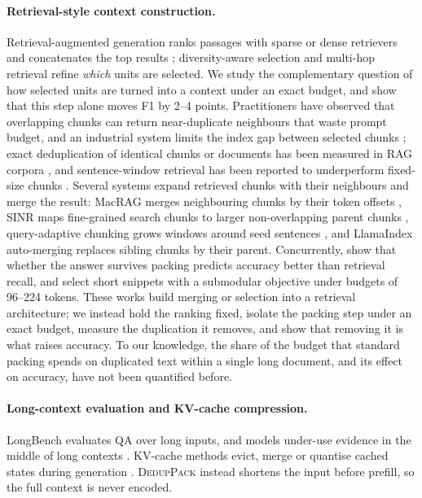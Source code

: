 \documentclass[11pt]{article}
\newcommand{\spk}{\textsc{DedupPack}}
\begin{document}
\paragraph{Retrieval-style context construction.}
Retrieval-augmented generation ranks passages with sparse \citep{robertson2009probabilistic} or dense \citep{karpukhin2020dense,xiao2023cpack} retrievers and concatenates the top results \citep{lewis2020retrieval,izacard2021leveraging}; diversity-aware selection \citep{carbonell1998mmr} and multi-hop retrieval \citep{xiong2021answering,trivedi2023interleaving} refine \emph{which} units are selected. We study the complementary question of how selected units are turned into a context under an exact budget, and show that this step alone moves F1 by 2--4 points. Practitioners have observed that overlapping chunks can return near-duplicate neighbours that waste prompt budget, and an industrial system limits the index gap between selected chunks \citep{sundar2026overlap}; exact deduplication of identical chunks or documents has been measured in RAG corpora \citep{bytedup2026}, and sentence-window retrieval has been reported to underperform fixed-size chunks \citep{eibich2024aragog}. Several systems expand retrieved chunks with their neighbours and merge the result: MacRAG merges neighbouring chunks by their token offsets \citep{lim2025macrag}, SINR maps fine-grained search chunks to larger non-overlapping parent chunks \citep{nainwani2025search}, query-adaptive chunking grows windows around seed sentences \citep{rastogi2026qasc}, and LlamaIndex auto-merging replaces sibling chunks by their parent. Concurrently, \citet{bala2026recall} show that whether the answer survives packing predicts accuracy better than retrieval recall, and select short snippets with a submodular objective under budgets of 96--224 tokens. These works build merging or selection into a retrieval architecture; we instead hold the ranking fixed, isolate the packing step under an exact budget, measure the duplication it removes, and show that removing it is what raises accuracy. To our knowledge, the share of the budget that standard packing spends on duplicated text within a single long document, and its effect on accuracy, have not been quantified before.

\paragraph{Long-context evaluation and KV-cache compression.}
LongBench \citep{bai2023longbench} evaluates QA over long inputs, and models under-use evidence in the middle of long contexts \citep{liu2024lost}. KV-cache methods evict, merge or quantise cached states during generation \citep{xiao2023streamingllm,zhang2023h2o,li2024snapkv,liu2024kivi}. \spk{} instead shortens the input before prefill, so the full context is never encoded.
\end{document}
